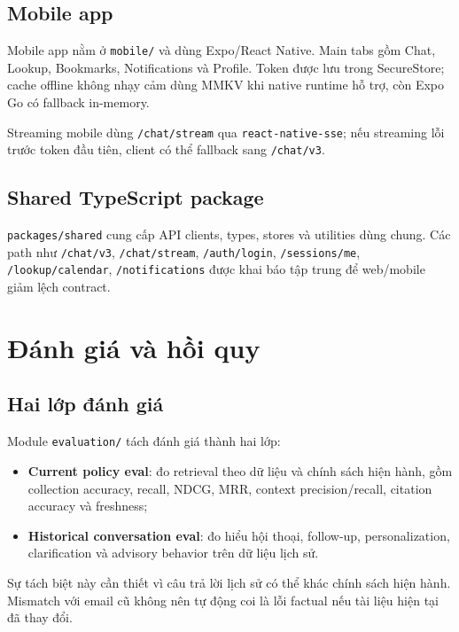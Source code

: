 \documentclass[../DoAn.tex]{subfiles}
\begin{document}
\subsection{Mobile app}

Mobile app nằm ở \texttt{mobile/} và dùng Expo/React Native. Main tabs gồm Chat,
Lookup, Bookmarks, Notifications và Profile. Token được lưu trong SecureStore;
cache offline không nhạy cảm dùng MMKV khi native runtime hỗ trợ, còn Expo Go có
fallback in-memory.

Streaming mobile dùng \texttt{/chat/stream} qua \texttt{react-native-sse}; nếu
streaming lỗi trước token đầu tiên, client có thể fallback sang \texttt{/chat/v3}.

\subsection{Shared TypeScript package}

\texttt{packages/shared} cung cấp API clients, types, stores và utilities dùng
chung. Các path như \texttt{/chat/v3}, \texttt{/chat/stream},
\texttt{/auth/login}, \texttt{/sessions/me}, \texttt{/lookup/calendar},
\texttt{/notifications} được khai báo tập trung để web/mobile giảm lệch contract.

\section{Đánh giá và hồi quy}

\subsection{Hai lớp đánh giá}

Module \texttt{evaluation/} tách đánh giá thành hai lớp:

\begin{itemize}
    \item \textbf{Current policy eval}: đo retrieval theo dữ liệu và chính sách
    hiện hành, gồm collection accuracy, recall, NDCG, MRR, context
    precision/recall, citation accuracy và freshness;
    \item \textbf{Historical conversation eval}: đo hiểu hội thoại, follow-up,
    personalization, clarification và advisory behavior trên dữ liệu lịch sử.
\end{itemize}

Sự tách biệt này cần thiết vì câu trả lời lịch sử có thể khác chính sách hiện
hành. Mismatch với email cũ không nên tự động coi là lỗi factual nếu tài liệu
hiện tại đã thay đổi.
\end{document}
